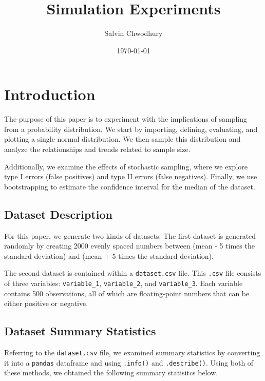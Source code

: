 \documentclass[a4paper,twocolumn]{article}
\title{Simulation Experiments}
\author{Salvin Chwodhury}
\date{\today}
\begin{document}
\setlength{\intextsep}{0pt}  %
\setlength{\textfloatsep}{5pt} %

\maketitle

\section{Introduction}
The purpose of this paper is to experiment with the implications of sampling from a probability distribution. 
We start by importing, defining, evaluating, and plotting a single normal distribution. We then sample this 
distribution and analyze the relationships and trends related to sample size.

Additionally, we examine the effects of stochastic sampling, where we explore type I errors (false positives) and
 type II errors (false negatives). Finally, we use bootstrapping to estimate the confidence interval for the median 
 of the dataset. \\


\subsection{Dataset Description}
For this paper, we generate two kinds of datasets. The first dataset is generated randomly by creating 2000 evenly 
spaced numbers between (mean - 5 times the standard deviation) and (mean + 5 times the standard deviation). 

The second dataset is contained within a \texttt{dataset.csv} file. This \texttt{.csv} file consists of three 
variables: \texttt{variable\_1}, \texttt{variable\_2}, and \texttt{variable\_3}. Each variable contains 500 
observations, all of which are floating-point numbers that can be either positive or negative.

\subsection{Dataset Summary Statistics}
Referring to the \texttt{dataset.csv} file, we examined summary statistics by converting it into a \texttt{pandas}
dataframe and using \texttt{.info()} and \texttt{.describe()}. Using both of these methods, we obtained the 
following summary statisitcs below. 
\end{document}
